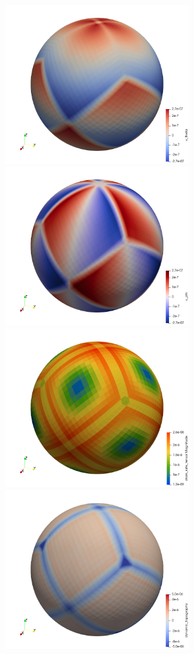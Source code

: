 \begin{center}
\includegraphics[width=8.2cm]{python_codes/fieldstone_152/results/exp1_axisymmetric/aspect/vtheta}
\includegraphics[width=8.2cm]{python_codes/fieldstone_152/results/exp1_axisymmetric/aspect/vphi}\\
\includegraphics[width=8.2cm]{python_codes/fieldstone_152/results/exp1_axisymmetric/aspect/sr}
\includegraphics[width=8.2cm]{python_codes/fieldstone_152/results/exp1_axisymmetric/aspect/dyntopo}\\

\end{center}
